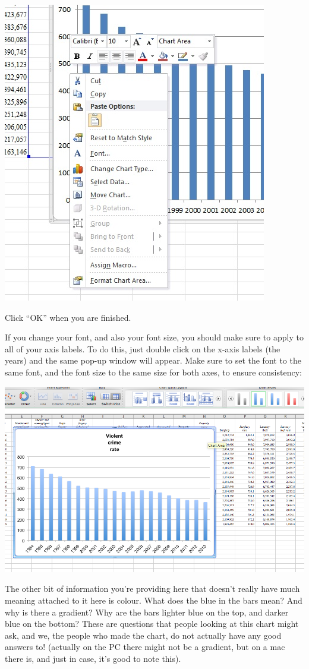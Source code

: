 \documentclass[]{book}
\theoremstyle{definition}
\theoremstyle{definition}
\theoremstyle{definition}
\theoremstyle{remark}
\begin{document}
\includegraphics{imgs/pc_change_font.jpg}

Click ``OK'' when you are finished.

If you change your font, and also your font size, you should make sure
to apply to all of your axis labels. To do this, just double click on
the x-axis labels (the years) and the same pop-up window will appear.
Make sure to set the font to the same font, and the font size to the
same size for both axes, to ensure consistency:

\includegraphics{imgs/desc_viz_10.png}

The other bit of information you're providing here that doesn't really
have much meaning attached to it here is colour. What does the blue in
the bars mean? And why is there a gradient? Why are the bars lighter
blue on the top, and darker blue on the bottom? These are questions that
people looking at this chart might ask, and we, the people who made the
chart, do not actually have any good answers to! (actually on the PC
there might not be a gradient, but on a mac there is, and just in case,
it's good to note this).
\end{document}
